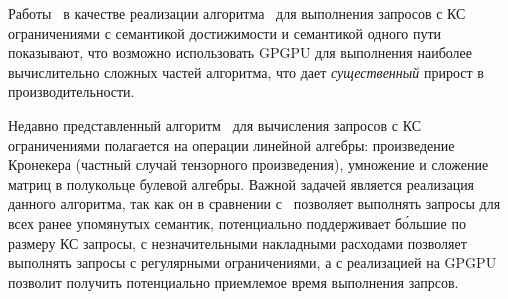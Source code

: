 Работы~\cite{inproceedings:cfpq_matrix_evaluation, inproceedings:cfqp_matrix_with_single_source} в качестве реализации алгоритма~\cite{inproceedings:matrix_cfpq} для выполнения запросов с КС ограничениями с семантикой достижимости и семантикой одного пути показывают, что возможно использовать GPGPU для выполнения наиболее вычислительно сложных частей алгоритма, что дает \textit{существенный} прирост в производительности. 

Недавно представленный алгоритм~\cite{inbook:kronecker_cfpq_adbis} для вычисления запросов с КС ограничениями полагается на операции линейной алгебры: произведение Кронекера (частный случай тензорного произведения), умножение и сложение матриц в полукольце булевой алгебры. Важной задачей является реализация данного алгоритма, так как он в сравнении с~\cite{inproceedings:cfqp_matrix_with_single_source} позволяет выполнять запросы для всех ранее упомянутых семантик, потенциально поддерживает б\'ольшие по размеру КС запросы, с незначительными накладными расходами позволяет выполнять запросы с регулярными ограничениями, а с реализацией на GPGPU позволит получить потенциально приемлемое время выполнения запрсов.